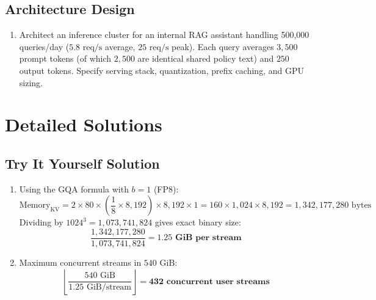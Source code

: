 \subsection*{Architecture Design}
\begin{enumerate}[label=\textbf{Exercise~\thechapter.\arabic*}, leftmargin=*, start=4]
  \item Architect an inference cluster for an internal RAG assistant handling 500,000 queries/day ($5.8\text{ req/s}$ average, $25\text{ req/s}$ peak). Each query averages $3,500$ prompt tokens (of which $2,500$ are identical shared policy text) and $250$ output tokens. Specify serving stack, quantization, prefix caching, and GPU sizing.
\end{enumerate}

\section{Detailed Solutions}

\subsection*{Try It Yourself Solution}
\begin{enumerate}[leftmargin=18pt]
  \item Using the GQA formula with $b=1$ (FP8):
  $$\text{Memory}_{\text{KV}} = 2 \times 80 \times \left(\frac{1}{8} \times 8,192\right) \times 8,192 \times 1 = 160 \times 1,024 \times 8,192 = 1,342,177,280\text{ bytes}$$
  Dividing by $1024^3 = 1,073,741,824$ gives exact binary size:
  $$\frac{1,342,177,280}{1,073,741,824} = \mathbf{1.25\text{ GiB per stream}}$$
  \item Maximum concurrent streams in $540\text{ GiB}$:
  $$\left\lfloor \frac{540\text{ GiB}}{1.25\text{ GiB/stream}} \right\rfloor = \mathbf{432\text{ concurrent user streams}}$$
\end{enumerate}

